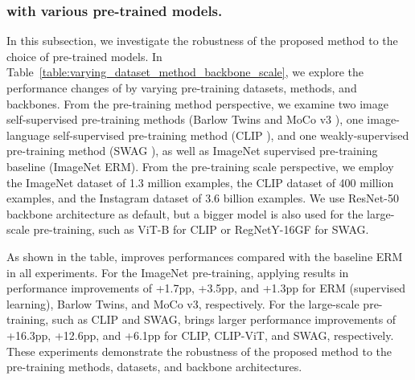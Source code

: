 \subsubsection{\method{} with various pre-trained models.} 
In this subsection, we investigate the robustness of the proposed method to the choice of pre-trained models.
In Table~\ref{table:varying_dataset_method_backbone_scale}, we explore the performance changes of \method{} by varying pre-training datasets, methods, and backbones.
From the pre-training method perspective, we examine two image self-supervised pre-training methods (Barlow Twins \cite{zbontar2021barlowtwins} and MoCo v3 \cite{chen2021mocov3}), one image-language self-supervised pre-training method (CLIP \cite{radford2021clip}), and one weakly-supervised pre-training method (SWAG \cite{singh2022swag}), as well as ImageNet supervised pre-training baseline (ImageNet ERM). 
From the pre-training scale perspective, we employ the ImageNet \cite{russakovsky2015imagenet} dataset of 1.3 million examples, the CLIP dataset of 400 million examples, and the Instagram dataset of 3.6 billion examples. 
We use ResNet-50 \cite{he2016_cvpr_resnet} backbone architecture as default, but a bigger model is also used for the large-scale pre-training, such as ViT-B \cite{dosovitskiy2021vit} for CLIP or RegNetY-16GF \cite{radosavovic2020regnet} for SWAG.

As shown in the table, \method{} improves performances compared with the baseline ERM in all experiments. For the ImageNet pre-training, applying \method{} results in performance improvements of +1.7pp, +3.5pp, and +1.3pp for ERM (supervised learning), Barlow Twins, and MoCo v3, respectively. For the large-scale pre-training, such as CLIP and SWAG, \method{} brings larger performance improvements of +16.3pp, +12.6pp, and +6.1pp for CLIP, CLIP-ViT, and SWAG, respectively.
These experiments demonstrate the robustness of the proposed method to the pre-training methods, datasets, and backbone architectures. 

